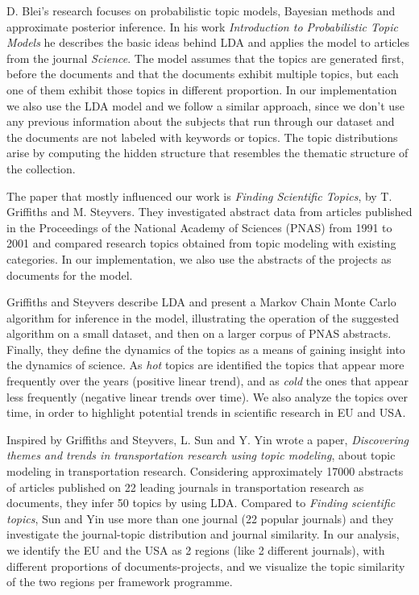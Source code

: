 \documentclass[12pt]{report}
\begin{document}
D. Blei's research focuses on probabilistic topic models, Bayesian methods and
approximate posterior inference. In his work \emph{Introduction to
Probabilistic Topic Models}\cite{Blei11introductionto} 
he describes the basic ideas behind LDA and
applies the model to articles from the journal \emph{Science}. 
The model assumes that the topics are generated
first, before the documents and that the documents exhibit multiple
topics, but each one of them exhibit those topics in different
proportion. In our implementation we also use the LDA model and we
follow a similar approach, since we don't use any previous information
about the subjects that run through our dataset and the documents are
not labeled with keywords or topics. The topic distributions arise by
computing the hidden structure that resembles the thematic structure
of the collection.

The paper that mostly influenced our work is \emph{Finding Scientific Topics}, by
T. Griffiths and M. Steyvers\cite{griffiths_steyvers04}. They investigated
abstract data from articles published in the Proceedings of the National Academy
of Sciences (PNAS) from 1991 to 2001 and compared research topics obtained from
topic modeling with existing categories. In our implementation, we also use 
the abstracts of the projects as documents for the model.

Griffiths and Steyvers describe LDA and present a Markov Chain Monte Carlo
algorithm for inference in the model, illustrating the operation of the
suggested algorithm on a small dataset, and then on a larger corpus of PNAS
abstracts. Finally, they define the dynamics of the topics as a means of gaining
insight into the dynamics of science. As \emph{hot} topics are identified the topics
that appear more frequently over the years (positive linear trend), and as
\emph{cold} the ones that appear less frequently (negative linear trends over time).
We also analyze the topics over time, in order to highlight potential trends in
scientific research in EU and USA.

Inspired by Griffiths and Steyvers, L. Sun and Y. Yin wrote a paper,
\emph{Discovering themes and trends in transportation research using topic
modeling}\cite{Sun201749}, about topic modeling in transportation
research. Considering approximately 17000 abstracts of articles
published on 22 leading journals in transportation research as
documents, they infer 50 topics by using LDA. Compared to \emph{Finding
scientific topics}, Sun and Yin use more than one journal (22 popular
journals) and they investigate the journal-topic distribution and
journal similarity. In our analysis, we identify the EU and the USA as
2 regions (like 2 different journals), with different proportions of
documents-projects, and we visualize the topic similarity of the two
regions per framework programme.
\end{document}
